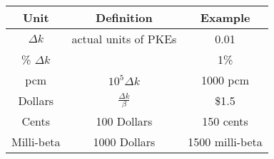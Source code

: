 \documentclass{school-22.211-notes}
\begin{document}
\begin{table}[ht]
  \centering
  \begin{tabular}{|c|c|c|} \hline
    Unit & Definition & Example \\ \hline
    $\Delta k$ & actual units of PKEs & 0.01 \\
    \% $\Delta k$ & & 1\% \\
    pcm & $10^5 \Delta k $ & 1000 pcm \\ \hline
    Dollars & $\frac{\Delta k}{\beta}$ & \$1.5 \\
    Cents & 100 Dollars & 150 cents \\ 
    Milli-beta & 1000 Dollars & 1500 milli-beta \\ \hline
  \end{tabular}
\end{table}
\end{document}
